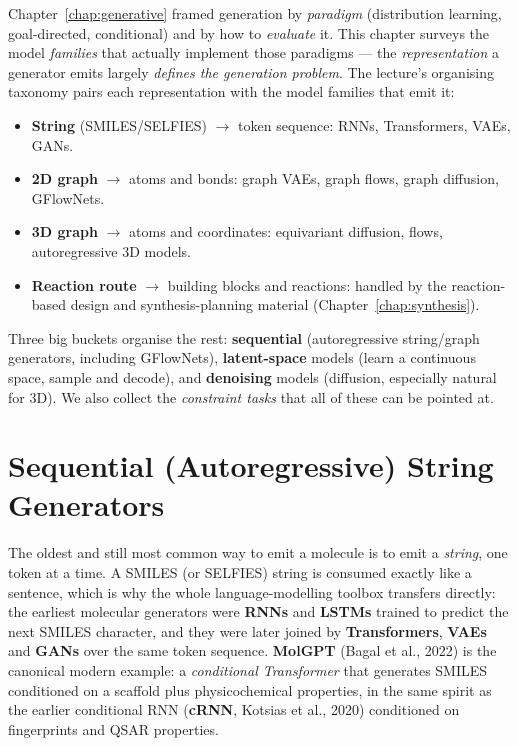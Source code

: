 \documentclass[11pt, oneside]{book}
\begin{document}
Chapter~\ref{chap:generative} framed generation by \emph{paradigm} (distribution
learning, goal-directed, conditional) and by how to \emph{evaluate} it. This chapter
surveys the model \emph{families} that actually implement those paradigms --- the
\emph{representation} a generator emits largely \emph{defines the generation problem}.
The lecture's organising taxonomy pairs each representation with the model families
that emit it:
\begin{itemize}
  \item \textbf{String} (SMILES/SELFIES) $\to$ token sequence: RNNs, Transformers,
        VAEs, GANs.
  \item \textbf{2D graph} $\to$ atoms and bonds: graph VAEs, graph flows, graph
        diffusion, GFlowNets.
  \item \textbf{3D graph} $\to$ atoms and coordinates: equivariant diffusion, flows,
        autoregressive 3D models.
  \item \textbf{Reaction route} $\to$ building blocks and reactions: handled by the
        reaction-based design and synthesis-planning material
        (Chapter~\ref{chap:synthesis}).
\end{itemize}
Three big buckets organise the rest: \textbf{sequential} (autoregressive string/graph
generators, including GFlowNets), \textbf{latent-space} models
(learn a continuous space, sample and decode), and \textbf{denoising} models
(diffusion, especially natural for 3D). We also collect the \emph{constraint tasks}
that all of these can be pointed at.

\section{Sequential (Autoregressive) String Generators}

The oldest and still most common way to emit a molecule is to emit a
\emph{string}, one token at a time. A SMILES (or SELFIES) string is consumed
exactly like a sentence, which is why the whole language-modelling toolbox
transfers directly: the earliest molecular generators were \textbf{RNNs} and
\textbf{LSTMs} trained to predict the next SMILES character, and they were later
joined by \textbf{Transformers}, \textbf{VAEs} and \textbf{GANs} over the same
token sequence. \textbf{MolGPT} (Bagal et al., 2022) is the canonical modern
example: a \emph{conditional Transformer} that generates SMILES conditioned on a
scaffold plus physicochemical properties, in the same spirit as the earlier
conditional RNN (\textbf{cRNN}, Kotsias et al., 2020) conditioned on
fingerprints and QSAR properties.
\end{document}
